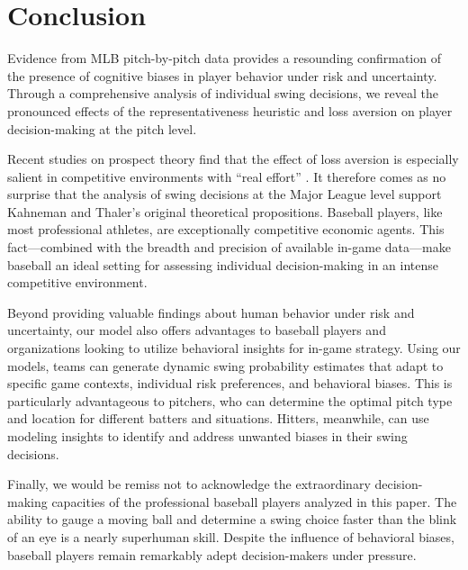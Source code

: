 \documentclass[12pt]{article}
\numberwithin{equation}{section}
\begin{document}
\section{Conclusion}

Evidence from MLB pitch-by-pitch data provides a resounding confirmation of the presence of cognitive biases in player behavior under risk and uncertainty. Through a comprehensive analysis of individual swing decisions, we reveal the pronounced effects of the representativeness heuristic and loss aversion on player decision-making at the pitch level.

\vspace{5mm} %

Recent studies on prospect theory find that the effect of loss aversion is especially salient in competitive environments with “real effort”  \parencite{Gill12}. It therefore comes as no surprise that the analysis of swing decisions at the Major League level support Kahneman and Thaler’s original theoretical propositions. Baseball players, like most professional athletes, are exceptionally competitive economic agents. This fact---combined with the breadth and precision of available in-game data---make baseball an ideal setting for assessing individual decision-making in an intense competitive environment.

\vspace{5mm} %

Beyond providing valuable findings about human behavior under risk and uncertainty, our model also offers advantages to baseball players and organizations looking to utilize behavioral insights for in-game strategy. Using our models, teams can generate dynamic swing probability estimates that adapt to specific game contexts, individual risk preferences, and behavioral biases. This is particularly advantageous to pitchers, who can determine the optimal pitch type and location for different batters and situations. Hitters, meanwhile, can use modeling insights to identify and address unwanted biases in their swing decisions.

\vspace{5mm} %

Finally, we would be remiss not to acknowledge the extraordinary decision-making capacities of the professional baseball players analyzed in this paper. The ability to gauge a moving ball and determine a swing choice faster than the blink of an eye is a nearly superhuman skill. Despite the influence of behavioral biases, baseball players remain remarkably adept decision-makers under pressure. 
\end{document}
